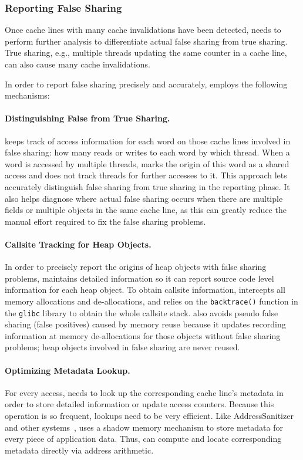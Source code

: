 \subsubsection{Reporting False Sharing}

Once cache lines with many cache invalidations have been detected,
\Predator{} needs to perform further analysis to differentiate actual false sharing from true sharing. 
True sharing, e.g., multiple threads updating the same counter in a cache line, can also cause many cache invalidations.

In order to report false sharing precisely and accurately,  
\Predator{} employs the following mechanisms:

\paragraph{Distinguishing False from True Sharing.} \Predator{} keeps track of access information for each word on those cache lines involved in false sharing: how many reads or writes to each word by which thread.  When a word is accessed by multiple threads, \Predator{} marks the origin of this word as a shared access and does not track threads for further accesses to it. This approach lets \Predator{} accurately distinguish false sharing from true sharing in the reporting phase.  It also helps diagnose where
actual false sharing occurs when there are multiple fields or multiple
objects in the same cache line, as this can greatly reduce the manual
effort required to fix the false sharing problems.

\paragraph{Callsite Tracking for Heap Objects.} In order to precisely report the origins of heap objects with false
sharing problems, \Predator{} maintains detailed information so it can report source code level information for each heap
object. To obtain callsite information, \Predator{} intercepts all memory allocations and de-allocations, and relies
on the \texttt{backtrace()} function in the \texttt{glibc} library to obtain the whole callsite stack.
\Predator{} also avoids pseudo false sharing (false positives) caused by memory reuse because it updates recording information at memory de-allocations for those objects without false sharing problems; heap objects involved in false 
sharing are never reused.

\paragraph{Optimizing Metadata Lookup.}
For every access, \Predator{} needs to look up the corresponding cache line's metadata 
in order to store detailed information or update access counters. Because this operation is so frequent,
 lookups need to be very efficient.
Like 
AddressSanitizer~\cite{Addresssanitizer} and other systems~\cite{qinzhaodetection,Valgrind},
\Predator{} uses a shadow memory mechanism to store metadata for every piece of application data. 
Thus, \Predator{} can compute and locate corresponding metadata directly via address arithmetic.

